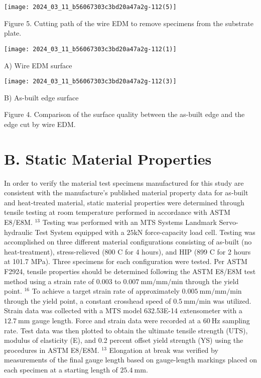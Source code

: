 \documentclass[10pt]{article}
\begin{document}
\begin{center}
\texttt{[image: 2024\_03\_11\_b56067303c3bd20a47a2g-112(5)]}
\end{center}

Figure 5. Cutting path of the wire EDM to remove specimens from the substrate plate.

\begin{center}
\texttt{[image: 2024\_03\_11\_b56067303c3bd20a47a2g-112(1)]}
\end{center}

A) Wire EDM surface

\begin{center}
\texttt{[image: 2024\_03\_11\_b56067303c3bd20a47a2g-112(3)]}
\end{center}

B) As-built edge surface

Figure 4. Comparison of the surface quality between the as-built edge and the edge cut by wire EDM.

\section*{B. Static Material Properties}
In order to verify the material test specimens manufactured for this study are consistent with the manufacture's published material property data for as-built and heat-treated material, static material properties were determined through tensile testing at room temperature performed in accordance with ASTM E8/E8M. ${ }^{13}$ Testing was performed with an MTS Systems Landmark Servo-hydraulic Test System equipped with a $25 \mathrm{kN}$ force-capacity load cell. Testing was accomplished on three different material configurations consisting of as-built (no heat-treatment), stress-relieved (800 C for 4 hours), and HIP (899 C for 2 hours at 101.7 MPa). Three specimens for each configuration were tested. Per ASTM F2924, tensile properties should be determined following the ASTM E8/E8M test method using a strain rate of 0.003 to $0.007 \mathrm{~mm} / \mathrm{mm} / \mathrm{min}$ through the yield point. ${ }^{16}$ To achieve a target strain rate of approximately $0.005 \mathrm{~mm} / \mathrm{mm} / \mathrm{min}$ through the yield point, a constant crosshead speed of $0.5 \mathrm{~mm} / \mathrm{min}$ was utilized. Strain data was collected with a MTS model 632.53E-14 extensometer with a $12.7 \mathrm{~mm}$ gauge length. Force and strain data were recorded at a $60 \mathrm{~Hz}$ sampling rate. Test data was then plotted to obtain the ultimate tensile strength (UTS), modulus of elasticity (E), and 0.2 percent offset yield strength (YS) using the procedures in ASTM E8/E8M. ${ }^{13}$ Elongation at break was verified by measurements of the final gauge length based on gauge-length markings placed on each specimen at a starting length of $25.4 \mathrm{~mm}$.
\end{document}
